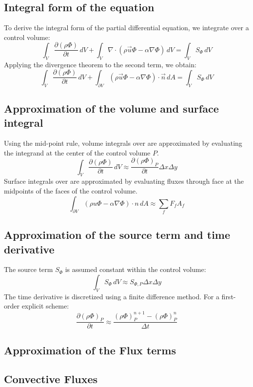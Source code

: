 \documentclass{article}
\begin{document}
\subsection{Integral form of the equation}

To derive the integral form of the partial differential equation, we integrate over a control volume:
\[
\int_V \frac{\partial (\rho \Phi)}{\partial t} \, dV + \int_V \nabla \cdot (\rho \vec{u} \Phi - \alpha \nabla \Phi) \, dV = \int_V S_\Phi \, dV
\]
Applying the divergence theorem to the second term, we obtain:
\[
\int_V \frac{\partial (\rho \Phi)}{\partial t} \, dV + \int_{\partial V} (\rho \vec{u} \Phi - \alpha \nabla \Phi) \cdot \vec{n} \, dA = \int_V S_\Phi \, dV
\]

\subsection{Approximation of the volume and surface integral}

Using the mid-point rule, volume integrals over are approximated by evaluating the integrand at the center of the control volume \( P \).
\[
\int_V \frac{\partial (\rho \Phi)}{\partial t} \, dV \approx \frac{\partial (\rho \Phi)_P}{\partial t} \Delta x \Delta y
\]
Surface integrals over are approximated by evaluating fluxes through face at the midpoints of the faces of the control volume.
\[
\int_{\partial V} \left( \rho u \Phi - \alpha \nabla \Phi \right) \cdot n \, dA \approx \sum_f F_f A_f
\]


\subsection{Approximation of the source term and time derivative}

The source term \( S_\Phi \) is assumed constant within the control volume:
\[
\int_V S_\Phi \, dV \approx S_{\Phi, P} \Delta x \Delta y
\]
The time derivative is discretized using a finite difference method. For a first-order explicit scheme:
\[
\frac{\partial (\rho \Phi)_P}{\partial t} \approx 
\frac{(\rho \Phi)_P^{n+1} - (\rho \Phi)_P^n}{\Delta t}
\]

\subsection{Approximation of the Flux terms}

\subsection*{Convective Fluxes}
\end{document}

